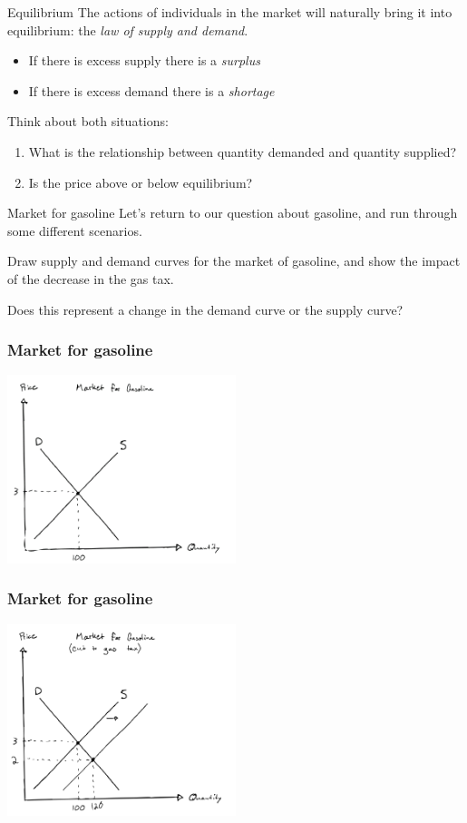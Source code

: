 \documentclass[aspectratio=169]{beamer}
\begin{document}
\begin{frame}{Equilibrium}
    The actions of individuals in the market will naturally bring it into equilibrium: the \textit{law of supply and demand}.
    \begin{itemize}
        \item If there is excess supply there is a \textit{surplus}
        \item If there is excess demand there is a \textit{shortage}
    \end{itemize}

    Think about both situations:
    \begin{enumerate}
        \item What is the relationship between quantity demanded and quantity supplied?
        \item Is the price above or below equilibrium?
    \end{enumerate}
\end{frame}

\begin{frame}{Market for gasoline}
    Let's return to our question about gasoline, and run through some different scenarios.

    \medskip

    Draw supply and demand curves for the market of gasoline, and show the impact of the decrease in the gas tax.

    \medskip

    Does this represent a change in the demand curve or the supply curve?
\end{frame}

\begin{frame}
    \frametitle{Market for gasoline}
    \centering
    \includegraphics[width = 0.5\textwidth,keepaspectratio]{market_for_gas.png}
\end{frame}

\begin{frame}
    \frametitle{Market for gasoline}
    \centering
    \includegraphics[width = 0.5\textwidth,keepaspectratio]{tax_cut.png}
\end{frame}
\end{document}
